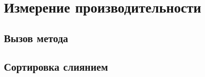 \section{Измерение производительности}


\subsection{Вызов метода}


\subsection{Сортировка слиянием}

